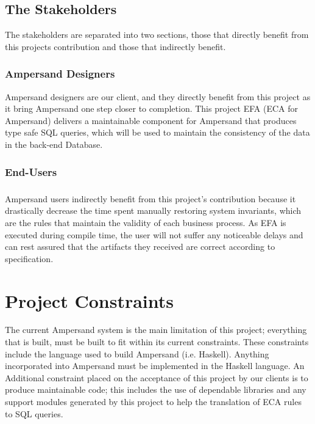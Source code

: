 \documentclass[12pt]{report}
\begin{document}
\section{The Stakeholders}\label{sec:Stakeholders}
The stakeholders are separated into two sections, those that directly benefit 
from this projects contribution and those that indirectly benefit.
\subsection{Ampersand Designers}\label{subsec:Ampersand}
Ampersand designers are our client, and they directly benefit from this project 
as it bring Ampersand one step closer to completion. This project EFA (ECA for 
Ampersand) delivers a maintainable component for Ampersand that produces type 
safe SQL queries, which will be used to maintain the consistency of the data in the back-end Database. 

\subsection{End-Users}\label{subsec:BusReq}
\paragraph{}
Ampersand users indirectly benefit from this project's contribution because it 
drastically decrease the time spent manually restoring system invariants, which 
are the rules that maintain the validity of each business process. As EFA is 
executed during compile time, the user will not suffer any noticeable delays 
and can rest assured that the artifacts they received are correct according to 
specification.

\chapter{Project Constraints}\label{ch:Constraints}
The current Ampersand system is the main limitation of this project; everything 
that is built, must be built to fit within its current constraints. These 
constraints include the language used to build Ampersand (i.e. Haskell). 
Anything incorporated into Ampersand must be implemented in the Haskell 
language. An Additional constraint placed on 
the acceptance of this project by our clients is to produce maintainable 
code; this includes the use of dependable libraries and any support modules 
generated by this project to help the translation of ECA rules to SQL queries.
\end{document}
